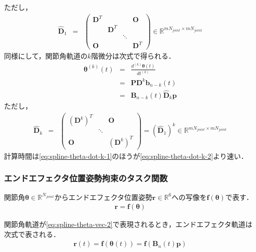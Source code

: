 ただし，
\begin{eqnarray}
  \bm{\hat{D}}_1 &=& \begin{pmatrix} \bm{D}^T&&&\bm{O}\\&\bm{D}^T&&\\&&\ddots&\\\bm{O}&&&\bm{D}^T \end{pmatrix} \in \mathbb{R}^{m N_{\mathit{joint}} \times m N_{\mathit{joint}}}
\end{eqnarray}
同様にして，関節角軌道の$k$階微分は次式で得られる．
\begin{eqnarray}
  \bm{\theta}^{(k)}(t) &=& \frac{d^{(k)} \bm{\theta}(t)}{d t^{(k)}} \\
  &=& \bm{P} \bm{D}^k \bm{b}_{n-k}(t) \label{eq:spline-theta-dot-k-1} \\
  &=& \bm{B}_{n-k}(t) \bm{\hat{D}}_k \bm{p} \label{eq:spline-theta-dot-k-2}
\end{eqnarray}
ただし，
\begin{eqnarray}
  \bm{\hat{D}}_k &=& \begin{pmatrix} (\bm{D}^k)^T&&\bm{O}\\&\ddots&\\\bm{O}&&(\bm{D}^k)^T \end{pmatrix} = (\bm{\hat{D}}_1)^k \in \mathbb{R}^{m N_{\mathit{joint}} \times m N_{\mathit{joint}}}
\end{eqnarray}
計算時間は\eqref{eq:spline-theta-dot-k-1}のほうが\eqref{eq:spline-theta-dot-k-2}より速い．

\subsubsection*{エンドエフェクタ位置姿勢拘束のタスク関数}

関節角$\bm{\theta} \in \mathbb{R}^{N_{\mathit{joint}}}$からエンドエフェクタ位置姿勢$\bm{r} \in \mathbb{R}^6$への写像を$\bm{f}(\bm{\theta})$で表す．
\begin{eqnarray}
  \bm{r} = \bm{f}(\bm{\theta})
\end{eqnarray}

関節角軌道が\eqref{eq:spline-theta-vec-2}で表現されるとき，エンドエフェクタ軌道は次式で表される．
\begin{eqnarray}
  \bm{r}(t) = \bm{f}(\bm{\theta}(t)) = \bm{f}(\bm{B}_n(t) \bm{p})
\end{eqnarray}

